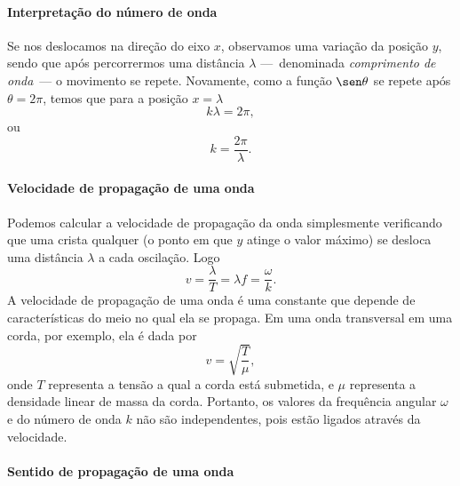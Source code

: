 \paragraph{Interpretação do número de onda}

Se nos deslocamos na direção do eixo $x$, observamos uma variação da posição $y$, sendo que após percorrermos uma distância $\lambda$ ---~denominada \emph{comprimento de onda}~--- o movimento se repete. Novamente, como a função $\sen\theta$ se repete após $\theta = 2\pi$, temos que para a posição $x = \lambda$
\begin{equation}
	k \lambda = 2\pi,
\end{equation}
%
ou
\begin{equation}
	k = \frac{2\pi}{\lambda}.
\end{equation}

\paragraph{Velocidade de propagação de uma onda}

Podemos calcular a velocidade de propagação da onda simplesmente verificando que uma crista qualquer (o ponto em que $y$ atinge o valor máximo) se desloca uma distância $\lambda$ a cada oscilação. Logo
\begin{equation}\label{Eq:RelVelFreqAngNumOnda}
	v = \frac{\lambda}{T} = \lambda f = \frac{\omega}{k}.
\end{equation}
%
A velocidade de propagação de uma onda é uma constante que depende de características do meio no qual ela se propaga. Em uma onda transversal em uma corda, por exemplo, ela é dada por
\begin{equation}\label{Eq:VelocidadeOndaEmUmaCorda}
    v = \sqrt{\frac{T}{\mu}},
\end{equation}
%
onde $T$ representa a tensão a qual a corda está submetida, e $\mu$ representa a densidade linear de massa da corda. Portanto, os valores da frequência angular $\omega$ e do número de onda $k$ não são independentes, pois estão ligados através da velocidade.

\paragraph{Sentido de propagação de uma onda}

